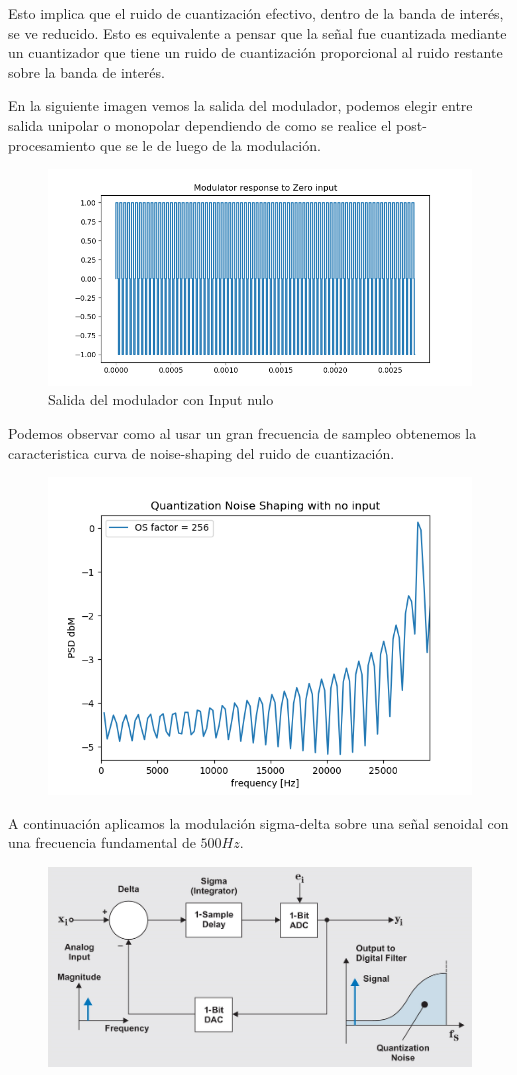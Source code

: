 Esto implica que el ruido de cuantización efectivo, dentro de la banda de interés, se ve reducido. Esto es equivalente a pensar que la señal fue cuantizada mediante un cuantizador que tiene un ruido de cuantización proporcional al ruido restante sobre la banda de interés.

En la siguiente imagen vemos la salida del modulador, podemos elegir entre salida unipolar o monopolar dependiendo de como se realice el post-procesamiento que se le de luego de la modulación.
 
\begin{figure}[H]
	\centering
	\includegraphics[width=0.7\linewidth]{ImagenesEjercicio2/OutoutZeroInput}
	\caption{Salida del modulador con Input nulo}
	\label{fig:outoutzeroinput}
\end{figure}

Podemos observar como al usar un gran frecuencia de sampleo obtenemos la caracteristica curva de noise-shaping del ruido de cuantización.
\begin{figure}[H]
	\centering
	\includegraphics[width=0.7\linewidth]{ImagenesEjercicio2/QnoiseNoInput}
	\caption{}
	\label{fig:qnoisenoinput}
\end{figure}


A continuación aplicamos la modulación sigma-delta sobre una señal senoidal con una frecuencia fundamental de $500Hz$. 
\begin{figure}[H]
	\centering
	\includegraphics[width=0.7\linewidth]{ImagenesEjercicio2/NoiseShapingFullsche}
	\caption{}
	\label{fig:noiseshapingfullsche}
\end{figure}



